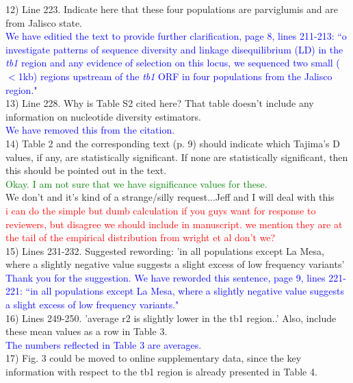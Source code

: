 \documentclass[11pt]{article}
\newcommand{\res}[1]{\noindent \textcolor{blue}{{#1}} \\}
\newcommand{\jri}[1]{\noindent \textcolor{red}{{#1}} \\}
\newcommand{\lev}[1]{\noindent \textcolor{green}{{#1}} \\}
\newcommand{\mbh}[1]{\noindent \textcolor{Dandelion}{{#1}}\\}
\begin{document}
12) Line 223. Indicate here that these four populations are parviglumis and are from Jalisco state. \\

\res{We have editied the text to provide further clarification, page 8, lines 211-213: ``o investigate patterns of sequence diversity and linkage disequilibrium (LD) in the \emph{tb1} region and any evidence of selection on this locus, we sequenced two small ($<$1kb) regions upstream of the \emph{tb1} ORF in four populations from the Jalisco region."}

13) Line 228. Why is Table S2 cited here? That table doesn't include any information on nucleotide diversity estimators.\\

\res{We have removed this from the citation.}

14) Table 2 and the corresponding text (p. 9) should indicate which Tajima's D values, if any, are statistically significant. If none are statistically significant, then this should be pointed out in the text. \\

\lev{Okay. I am not sure that we have significance values for these.}

\mbh{We don't and it's kind of a strange/silly request...Jeff and I will deal with this}
\jri{ i can do the simple but dumb calculation if you guys want for response to reviewers, but disagree we should include in manuscript. we mention they are at the tail of the empirical distribution from wright et al don't we?}

15) Lines 231-232. Suggested rewording: 'in all populations except La Mesa, where a slightly negative value suggests a slight excess of low frequency variants'\\

\res{Thank you for the suggestion. We have reworded this sentence, page 9, lines 221-221: ``in all populations except La Mesa, where a slightly negative value suggests a slight excess of low frequency variants."}

16) Lines 249-250. 'average r2 is slightly lower in the tb1 region..' Also, include these mean values as a row in Table 3.\\

\res{The numbers reflected in Table 3 are averages.}

17) Fig. 3 could be moved to online supplementary data, since the key information with respect to the tb1 region is already presented in Table 4. \\
\end{document}
